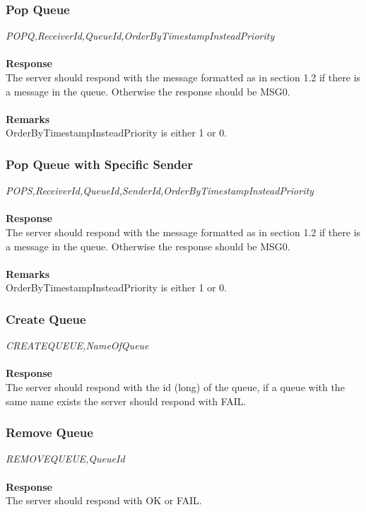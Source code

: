\documentclass{article}
\begin{document}
            \subsubsection{Pop Queue}
                \indent\indent\textit{POPQ,ReceiverId,QueueId,OrderByTimestampInsteadPriority}\\
                \\
                \textbf{Response}\\
                The server should respond with the message formatted as in section 1.2 if there is a message in the queue. Otherwise the response should be MSG0.\\
                \\
                \textbf{Remarks}\\
                OrderByTimestampInsteadPriority is either 1 or 0.

            \subsubsection{Pop Queue with Specific Sender}
                \indent\indent\textit{POPS,ReceiverId,QueueId,SenderId,OrderByTimestampInsteadPriority}\\
                \\
                \textbf{Response}\\
                The server should respond with the message formatted as in section 1.2 if there is a message in the queue. Otherwise the response should be MSG0.\\
                \\
                \textbf{Remarks}\\
                OrderByTimestampInsteadPriority is either 1 or 0.

            \subsubsection{Create Queue}
                \indent\indent\textit{CREATEQUEUE,NameOfQueue}\\
                \\
                \textbf{Response}\\
                The server should respond with the id (long) of the queue, if a queue with the same name exists the server should respond with FAIL.

            \subsubsection{Remove Queue}
                \indent\indent\textit{REMOVEQUEUE,QueueId}\\
                \\
                \textbf{Response}\\
                The server should respond with OK or FAIL.
\end{document}
